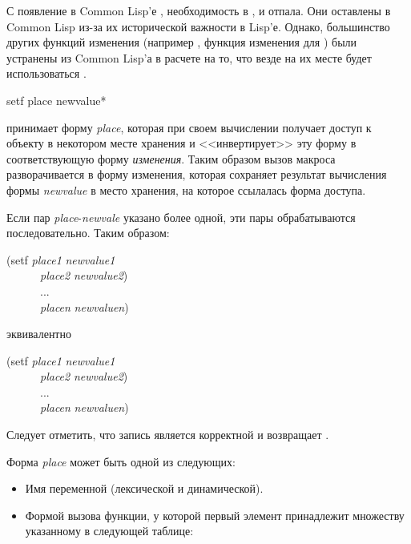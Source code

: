 С появление в Common Lisp'е , необходимость в , 
и  отпала. Они оставлены в Common Lisp из-за их исторической важности в
Lisp'е.
Однако, большинство других функций изменения (например , функция
изменения для ) были устранены из Common Lisp'а в расчете на то, что
везде на их месте будет использоваться .

\begin{defmac}
setf {place newvalue}*

 принимает форму \emph{place}, которая
при своем вычислении получает доступ к объекту в некотором месте хранения и
<<инвертирует>> эту форму в соответствующую форму \emph{изменения}.
Таким образом вызов макроса  разворачивается в форму изменения,
которая сохраняет результат вычисления формы \emph{newvalue} в место хранения,
на которое ссылалась форма доступа.

Если пар \emph{place}-\emph{newvale} указано более одной, эти пары
обрабатываются последовательно. Таким образом:
\begin{lisp}
(setf \emph{place1} \emph{newvalue1} \\
~~~~~~\emph{place2} \emph{newvalue2}) \\
~~~~~~... \\
~~~~~~\emph{placen} \emph{newvaluen})
\end{lisp}
эквивалентно
\begin{lisp}
(setf \emph{place1} \emph{newvalue1} \\
~~~~~~\emph{place2} \emph{newvalue2}) \\
~~~~~~... \\
~~~~~~\emph{placen} \emph{newvaluen})
\end{lisp}
Следует отметить, что запись  является корректной и возвращает {\nil}.

Форма \emph{place} может быть одной из следующих:
\begin{itemize}

\item
Имя переменной (лексической и динамической).

\item
Формой вызова функции, у которой первый элемент принадлежит множеству указанному
в следующей таблице:


\end{itemize}
\end{defmac}
